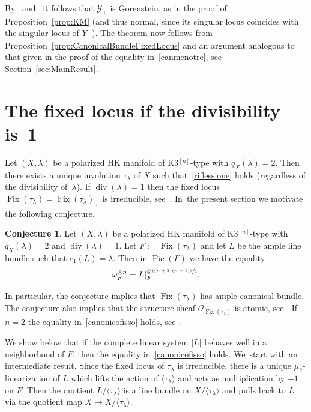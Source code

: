\documentclass[11pt]{article}
\newcommand{\psfrac}[2]{\sfrac{(#1)}{#2}}
\newcommand{\HK}{\textup{HK}\xspace}
\newcommand\cO{\mathcal{O}}
\newcommand\cY{\mathcal{Y}}
\DeclareMathOperator{\divisore}{div}\let\div\divisore
\DeclareMathOperator{\Fix}{Fix}
\DeclareMathOperator{\Pic}{Pic}
\let\la\langle
\let\ra\rangle
\theoremstyle{definition}
\newtheorem{conj}[lemm]{Conjecture}
\def\citestacks#1{\cite[\href{https://stacks.math.columbia.edu/tag/#1}{Tag #1}]{stacks-project}}
\begin{document}
By~\citestacks{0C05} and~\citestacks{0C11} it follows that $\cY_+$ is Gorenstein, as in the proof of Proposition~\ref{prop:KM} (and thus normal, since its singular locus coincides with the singular locus of $\overline{Y}_+$).
The theorem now follows from Proposition~\ref{prop:CanonicalBundleFixedLocus} and an argument analogous to that given in the proof of the equality in~\eqref{canmenotre}, see Section~\ref{sec:MainResult}.

\section{The fixed locus if the divisibility is~1}\label{sec:poscomp}

Let $(X,\lambda)$ be a polarized \HK manifold of K3$^{[n]}$-type with $q_X(\lambda)=2$.
Then there exists a unique involution $\tau_{\lambda}$ of $X$ such that~\eqref{riflessione} holds (regardless of the divisibility of~$\lambda$). If $\divisore(\lambda)=1$ then the fixed locus $\Fix(\tau_{\lambda})=\Fix(\tau_{\lambda})_+$ is irreducible, see~\cite[Main\,Th.]{involutions1}. In~the present section we motivate the following conjecture.

\begin{conj}\label{conj:GeneralTypeDiv1}
Let $(X,\lambda)$ be a polarized \HK manifold of K3$^{[n]}$-type with \hbox{$q_X(\lambda)\!=\!2$}
and $\divisore(\lambda)=1$.
Let $F:=\Fix(\tau_{\lambda})$ and let $L$ be the ample line bundle such that $c_1(L)=\lambda$.
Then in $\Pic(F)$ we have the equality
\begin{equation}\label{canonicofisso}
\omega_F^{\otimes n}= L|_{F}^{\otimes \psfrac{(n+2)(n+1)}{2}}.
\end{equation}
\end{conj}

In particular, the conjecture implies that $\Fix(\tau_{\lambda})$ has ample canonical bundle. The conjecture also implies that the structure sheaf $\cO_{\Fix(\tau_{\lambda})}$ is atomic, see \cite[Th.\,1.8]{beck:Atomic}.
If $n=2$ the equality in~\eqref{canonicofisso} holds, see~\cite[Th.\,1.1(1)]{Kieran:numhilb2}.

We show below that if the complete linear system $|L|$ behaves well in a neighborhood of $F$, then the equality in~\eqref{canonicofisso} holds. We~start with an intermediate result.
Since the fixed locus of $\tau_{\lambda}$ is irreducible, there is a unique $\mu_2$-linearization of $L$ which lifts the action of $\la\tau_{\lambda}\ra$ and acts as multiplication by $+1$ on $F$. Then the quotient $L/\langle \tau_\lambda\rangle$ is a line bundle on $X/\la\tau_{\lambda}\ra$ and pulls back to $L$ via the quotient map $X\to X/\la\tau_{\lambda}\ra$.
\end{document}
